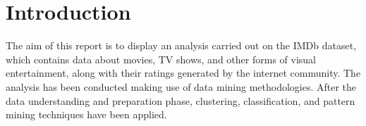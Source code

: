 \section*{Introduction}
\label{ch:introduzione}

The aim of this report is to display an analysis carried out on the IMDb dataset, which contains data about movies, TV shows, 
and other forms of visual entertainment, along with their ratings generated by the internet community. 
The analysis has been conducted making use of data mining methodologies. After the data understanding and preparation phase, 
clustering, classification, and pattern mining techniques have been applied.
